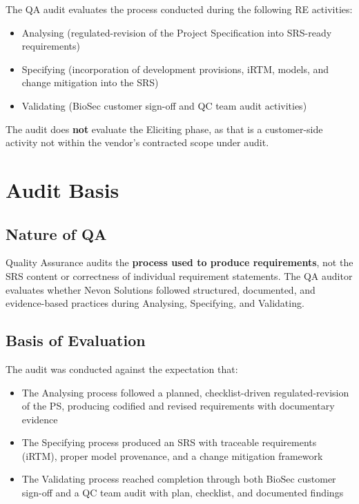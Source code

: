 \documentclass[11pt,a4paper]{article}
\begin{document}
The QA audit evaluates the process conducted during the following RE activities:

\begin{itemize}[leftmargin=*]
\item Analysing (regulated-revision of the Project Specification into SRS-ready requirements)
\item Specifying (incorporation of development provisions, iRTM, models, and change mitigation into the SRS)
\item Validating (BioSec customer sign-off and QC team audit activities)
\end{itemize}

The audit does \textbf{not} evaluate the Eliciting phase, as that is a customer-side activity not within the vendor's contracted scope under audit.


\section{Audit Basis}

\subsection{Nature of QA}

Quality Assurance audits the \textbf{process used to produce requirements}, not the SRS content or correctness of individual requirement statements. The QA auditor evaluates whether Nevon Solutions followed structured, documented, and evidence-based practices during Analysing, Specifying, and Validating.

\subsection{Basis of Evaluation}

The audit was conducted against the expectation that:

\begin{itemize}[leftmargin=*]
\item The Analysing process followed a planned, checklist-driven regulated-revision of the PS, producing codified and revised requirements with documentary evidence
\item The Specifying process produced an SRS with traceable requirements (iRTM), proper model provenance, and a change mitigation framework
\item The Validating process reached completion through both BioSec customer sign-off and a QC team audit with plan, checklist, and documented findings
\end{itemize}
\end{document}
